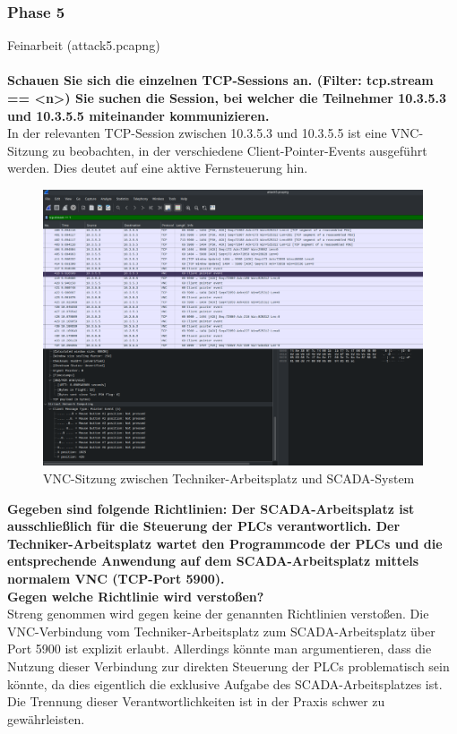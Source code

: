 \documentclass[
    a4paper,
    pagesize,
	pdftex,
    12pt,
]{scrartcl}
\begin{document}
\subsubsection{Phase 5}
Feinarbeit (attack5.pcapng)
\\ \\ 
\textbf{Schauen Sie sich die einzelnen TCP-Sessions an. (Filter: tcp.stream == <n>) Sie suchen die Session, bei welcher die Teilnehmer 10.3.5.3 und 10.3.5.5 miteinander kommunizieren.}
\\
In der relevanten TCP-Session zwischen 10.3.5.3 und 10.3.5.5 ist eine VNC-Sitzung zu beobachten, in der verschiedene Client-Pointer-Events ausgeführt werden. Dies deutet auf eine aktive Fernsteuerung hin.

\begin{figure}[H]
    \centering
    \includegraphics[width=\textwidth]{ws-vnc-session.png}
    \caption{VNC-Sitzung zwischen Techniker-Arbeitsplatz und SCADA-System}
    \label{fig:ws-vnc-session}
\end{figure}

\textbf{Gegeben sind folgende Richtlinien:
Der SCADA-Arbeitsplatz ist ausschließlich für die Steuerung der PLCs verantwortlich.
Der Techniker-Arbeitsplatz wartet den Programmcode der PLCs und die entsprechende Anwendung auf dem SCADA-Arbeitsplatz mittels normalem VNC (TCP-Port 5900).\\
Gegen welche Richtlinie wird verstoßen?}
\\
Streng genommen wird gegen keine der genannten Richtlinien verstoßen. Die VNC-Verbindung vom Techniker-Arbeitsplatz zum SCADA-Arbeitsplatz über Port 5900 ist explizit erlaubt. Allerdings könnte man argumentieren, dass die Nutzung dieser Verbindung zur direkten Steuerung der PLCs problematisch sein könnte, da dies eigentlich die exklusive Aufgabe des SCADA-Arbeitsplatzes ist. Die Trennung dieser Verantwortlichkeiten ist in der Praxis schwer zu gewährleisten.
\end{document}
